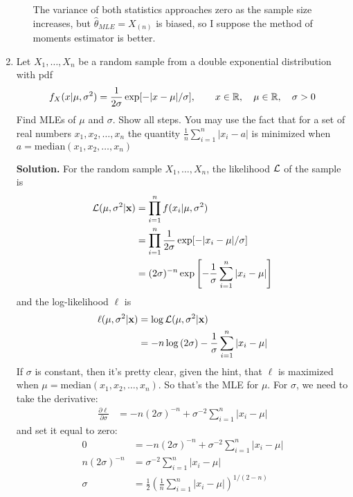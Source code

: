 \documentclass[titlepage]{article}
\begin{document}
\begin{enumerate}
\begin{enumerate}
  The variance of both statistics approaches zero as the sample size increases, but $\hat{\theta}_{MLE} = X_{(n)}$ is biased, so I suppose the method of moments estimator is better.
  \end{enumerate}

\item Let $X_1, \ldots, X_n$ be a random sample from a double exponential distribution with pdf
  \[f_X(x | \mu, \sigma^2) = \frac{1}{2\sigma}\exp[-|x-\mu|/\sigma], \qquad x \in \mathbb{R}, \quad \mu \in \mathbb{R}, \quad \sigma > 0\]
Find MLEs of $\mu$ and $\sigma$. Show all steps. You may use the fact that for a set of real numbers $x_1, x_2, \ldots, x_n$ the quantity $\frac{1}{n}\sum_{i=1}^n |x_i - a|$ is minimized when $a = \text{median}(x_1, x_2, \ldots, x_n)$

\textbf{Solution.} For the random sample $X_1, \ldots, X_n$, the likelihood $\mathcal{L}$ of the sample is
  \[ \begin{aligned}
  \mathcal{L}(\mu, \sigma^2 | \mathbf{x}) &= \prod_{i=1}^n f(x_i|\mu, \sigma^2) \\
  &= \prod_{i=1}^n\frac{1}{2\sigma} \exp[-|x_i - \mu|/\sigma] \\
  &= (2\sigma)^{-n} \exp\left[-\frac{1}{\sigma}\sum_{i=1}^n|x_i - \mu|\right]
  \end{aligned} \]
and the log-likelihood $\ell$ is
  \[ \begin{aligned}
  \ell(\mu, \sigma^2 | \mathbf{x}) &= \log \mathcal{L}(\mu, \sigma^2 | \mathbf{x}) \\
                                &= -n \log\left(2\sigma\right) - \frac{1}{\sigma}\sum_{i=1}^n |x_i - \mu|
  \end{aligned} \]
If $\sigma$ is constant, then it's pretty clear, given the hint, that $\ell$ is maximized when $\mu = \text{median}(x_1, x_2, \ldots, x_n)$. So that's the MLE for $\mu$. For $\sigma$, we need to take the derivative:
  \[\begin{aligned}
  \frac{\partial \ell}{\partial \sigma} &= -n(2\sigma)^{-n} + \sigma^{-2} \sum_{i=1}^n |x_i - \mu|
  \end{aligned}\]
and set it equal to zero:
  \[\begin{aligned}
  0 &= -n(2\sigma)^{-n} + \sigma^{-2} \sum_{i=1}^n |x_i - \mu| \\
  n(2\sigma)^{-n} &= \sigma^{-2} \sum_{i=1}^n |x_i - \mu| \\
  \sigma &= \frac{1}{2}\left(\frac{1}{n}\sum_{i=1}^n|x_i - \mu|\right)^{1/(2-n)}
  \end{aligned}\]


\end{enumerate}
\end{document}
